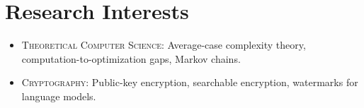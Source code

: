
\section*{Research Interests}
\begin{itemize}

\item \textsc{Theoretical Computer Science}: Average-case complexity theory, computation-to-optimization gaps, Markov chains.

\item \textsc{Cryptography}: Public-key encryption, searchable encryption, watermarks for language models.



\end{itemize}
